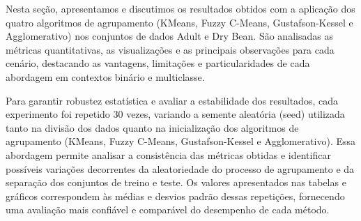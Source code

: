 Nesta seção, apresentamos e discutimos os resultados obtidos com a aplicação dos quatro algoritmos de agrupamento (KMeans, Fuzzy C-Means, Gustafson-Kessel e Agglomerativo) nos conjuntos de dados Adult e Dry Bean. São analisadas as métricas quantitativas, as visualizações e as principais observações para cada cenário, destacando as vantagens, limitações e particularidades de cada abordagem em contextos binário e multiclasse.





Para garantir robustez estatística e avaliar a estabilidade dos resultados, cada experimento foi repetido 30 vezes, variando a semente aleatória (seed) utilizada tanto na divisão dos dados quanto na inicialização dos algoritmos de agrupamento (KMeans, Fuzzy C-Means, Gustafson-Kessel e Agglomerativo). Essa abordagem permite analisar a consistência das métricas obtidas e identificar possíveis variações decorrentes da aleatoriedade do processo de agrupamento e da separação dos conjuntos de treino e teste. Os valores apresentados nas tabelas e gráficos correspondem às médias e desvios padrão dessas repetições, fornecendo uma avaliação mais confiável e comparável do desempenho de cada método.












